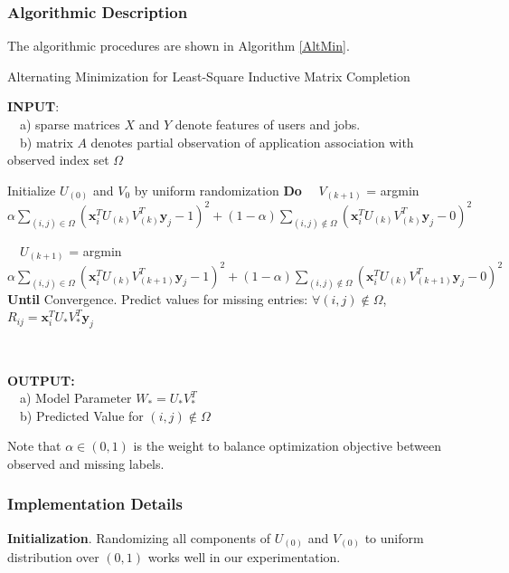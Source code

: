 \documentclass{article} %
\begin{document}
\subsubsection{Algorithmic Description} 
\newcommand{\xii}{\boldsymbol{x}_i}
\newcommand{\yj}{\boldsymbol{y}_j}
The algorithmic procedures are shown in Algorithm \ref{AltMin}.
\begin{algorithm}
    \caption{Alternating Minimization for Least-Square Inductive Matrix
        Completion}
    \label{alg:AltMin}
    \begin{algorithmic}[1]

\State \textbf{INPUT}: \\ \ \ a) sparse matrices $X$ and $Y$ denote features of users
and jobs. \\ \ \ b) matrix $A$ denotes partial observation of application
association with observed index set $\Omega$
\State \

\State Initialize $U_{(0)}$ and $V_{0}$ by uniform randomization
\State \textbf{Do}  
\State \  \
    $V_{(k+1)}$ = argmin $\alpha \sum_{(i,j) \in \Omega} 
    (\xii^T U_{(k)} V_{(k)}^T \yj - 1)^2 
    + (1-\alpha) \sum_{(i,j) \not \in \Omega} (\xii^T U_{(k)} V_{(k)}^T \yj - 0)^2$

\State \  \
$U_{(k+1)}$ = argmin $\alpha \sum_{(i,j) \in \Omega}(\xii^T
    U_{(k)} V_{(k+1)}^T \yj - 1)^2 +
    (1-\alpha) \sum_{(i,j) \not \in \Omega}(\xii^T U_{(k)} V_{(k+1)}^T \yj - 0)^2$
\State \textbf{Until} Convergence. 
\State Predict values for missing entries: $\forall (i,j) \not \in \Omega$, 
$R_{ij} = \xii^T U_{*} V_{*}^T \yj$

\State \

\State \textbf{OUTPUT: } \\ 
\ \ a) Model Parameter $W_{*} = U_{*} V_{*}^T$ \\ 
\ \ b) Predicted Value for $(i,j) \not \in \Omega$

\end{algorithmic}
\end{algorithm}

Note that $\alpha \in (0, 1)$ is the weight to balance optimization objective between
observed and missing labels.

\subsubsection{Implementation Details}
\textbf{Initialization}. Randomizing all components of $U_{(0)}$ and
$V_{(0)}$ to uniform distribution over $(0, 1)$ works well in our
experimentation. 
\end{document}
